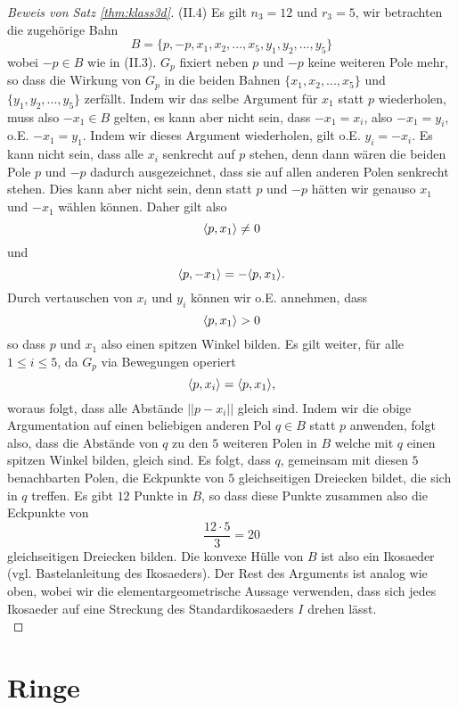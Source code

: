 \documentclass{book}
\begin{document}
\begin{proof}[Beweis von Satz \ref{thm:klass3d}]
    \noindent
    (II.4) Es gilt $n_3 = 12$ und $r_3 = 5$, wir betrachten die zugehörige Bahn
    \[
        B = \{p, -p, x_1, x_2, ..., x_5, y_1, y_2, ..., y_5\}
    \]
    wobei $-p \in B$ wie in (II.3). $G_p$ fixiert neben $p$ und $-p$ keine
    weiteren Pole mehr, so dass die Wirkung von $G_p$ in die beiden Bahnen
    $\{x_1, x_2, ..., x_5\}$ und $\{y_1, y_2, ..., y_5\}$ zerfällt. Indem wir
    das selbe Argument für $x_1$ statt $p$ wiederholen, muss also $-x_1 \in B$
    gelten, es kann aber nicht sein, dass $-x_1 = x_i$, also $-x_1 = y_i$, o.E.
    $-x_1 = y_1$. Indem wir dieses Argument wiederholen, gilt o.E. $y_i =
    -x_i$. Es kann nicht sein, dass alle $x_i$ senkrecht auf $p$ stehen, denn
    dann wären die beiden Pole $p$ und $-p$ dadurch ausgezeichnet, dass sie auf
    allen anderen Polen senkrecht stehen. Dies kann aber nicht sein, denn statt
    $p$ und $-p$ hätten wir genauso $x_1$ und $-x_1$ wählen können. Daher gilt also 
    \[
        \langle p, x_1 \rangle \ne 0
    \]
    und 
    \[
        \langle p, -x_1 \rangle = - \langle p, x_1 \rangle.
    \]
    Durch vertauschen von $x_i$ und $y_i$ können wir o.E. annehmen, dass 
    \[
        \langle p, x_1 \rangle > 0
    \]
    so dass $p$ und $x_1$ also einen spitzen Winkel bilden. Es gilt weiter, für
    alle $1 \le i \le 5$, da $G_p$ via Bewegungen operiert
    \[
        \langle p, x_i \rangle = \langle p, x_1 \rangle,
    \]
    woraus folgt, dass alle Abstände $||p - x_i||$ gleich sind. Indem wir die
    obige Argumentation auf einen beliebigen anderen Pol $q \in B$ statt
    $p$ anwenden, folgt also, dass die Abstände von $q$ zu den $5$ weiteren
    Polen in $B$ welche mit $q$ einen spitzen Winkel bilden, gleich sind. Es
    folgt, dass $q$, gemeinsam mit diesen $5$ benachbarten Polen, die Eckpunkte
    von $5$ gleichseitigen Dreiecken bildet, die sich in $q$ treffen. 
    Es gibt
    $12$ Punkte in $B$, so dass diese Punkte zusammen also die Eckpunkte von
    \[
        \frac{12 \cdot 5}{3} = 20
    \]
    gleichseitigen Dreiecken bilden. Die konvexe Hülle von $B$ ist also ein
    Ikosaeder (vgl. Bastelanleitung des Ikosaeders). Der Rest des Arguments ist
    analog wie oben, wobei wir die elementargeometrische Aussage verwenden, dass
    sich jedes Ikosaeder auf eine Streckung des Standardikosaeders $I$ drehen
    lässt.\\ 
\end{proof}

\chapter{Ringe}%
\label{cha:ringe}
\end{document}

